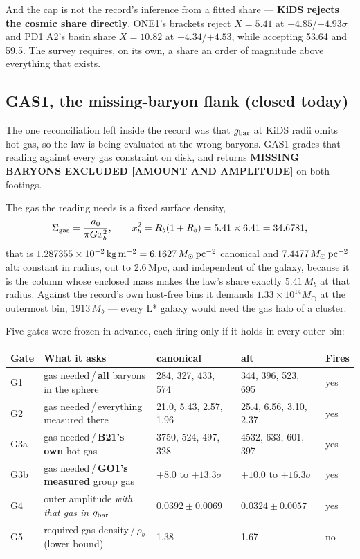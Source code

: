 \documentclass[10pt]{article}
\begin{document}
And the cap is not the record's inference from a fitted share --- {\bf KiDS rejects the cosmic share directly}. ONE1's
brackets reject $X=5.41$ at $+4.85$/$+4.93\sigma$ and PD1 A2's basin share $X=10.82$ at $+4.34$/$+4.53$, while accepting
53.64 and 59.5. The survey requires, on its own, a share an order of magnitude above everything that exists.

\subsection{GAS1, the missing-baryon flank (closed today)}
The one reconciliation left inside the record was that $g_{\rm bar}$ at KiDS radii omits hot gas, so the law is being
evaluated at the wrong baryons. GAS1 grades that reading against every gas constraint on disk, and returns
{\bf MISSING BARYONS EXCLUDED [AMOUNT AND AMPLITUDE]} on both footings.

The gas the reading needs is a fixed surface density,
\[
\Sigma_{\rm gas}=\frac{a_0}{\pi G x_b^{2}},\qquad x_b^{2}=R_b(1+R_b)=5.41\times6.41=34.6781,
\]
that is $1.287355\times10^{-2}{\rm \,kg\,m^{-2}}=6.1627\,M_\odot\,{\rm pc}^{-2}$ canonical and
$7.4477\,M_\odot\,{\rm pc}^{-2}$ alt: constant in radius, out to 2.6\,Mpc, and independent of the galaxy, because it is the
column whose enclosed mass makes the law's share exactly $5.41\,M_b$ at that radius. Against the record's own host-free bins it
demands $1.33\times10^{14}M_\odot$ at the outermost bin, $1913\,M_b$ --- every L* galaxy would need the gas halo of a cluster.

Five gates were frozen in advance, each firing only if it holds in every outer bin:

\begin{center}\small
\begin{tabular}{@{}lllll@{}}\toprule
Gate & What it asks & canonical & alt & Fires\\\midrule
G1 & gas needed\,/\,{\bf all} baryons in the sphere & 284, 327, 433, 574 & 344, 396, 523, 695 & yes\\
G2 & gas needed\,/\,everything measured there & 21.0, 5.43, 2.57, 1.96 & 25.4, 6.56, 3.10, 2.37 & yes\\
G3a & gas needed\,/\,{\bf B21's own} hot gas & 3750, 524, 497, 328 & 4532, 633, 601, 397 & yes\\
G3b & gas needed\,/\,{\bf GO1's measured} group gas & $+8.0$ to $+13.3\sigma$ & $+10.0$ to $+16.3\sigma$ & yes\\
G4 & outer amplitude {\it with that gas in} $g_{\rm bar}$ & $0.0392\pm0.0069$ & $0.0324\pm0.0057$ & yes\\
G5 & required gas density\,/\,$\rho_b$ (lower bound) & 1.38 & 1.67 & no\\\bottomrule
\end{tabular}
\end{center}
\end{document}

